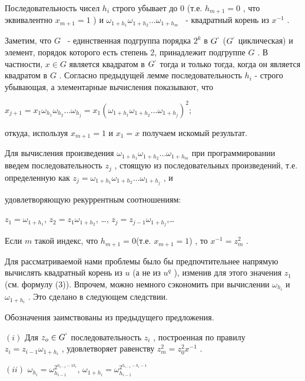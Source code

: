 Последовательность чисел $h_i$
 строго убывает до 0 (т.е. $h_{m+1}=0$
    , что эквивалентно $x_{m+1}=1$
) и $\omega_{1+h_1}\omega_{1+h_2}\ldots\omega_{1+h_m}$
 ~- квадратный корень из $x^{-1}$
 .


\begin{myproof}
Заметим, что $G$
 ~- единственная подгруппа порядка $2^k$
 в $G^`$
 ($G^`$
 циклическая) и элемент, порядок которого есть степень 2, принадлежит подгруппе $G$
 . В частности, $x\in G$
 является квадратом в $G^`$
 тогда и только тогда, когда он является квадратом в $G$
 .
Согласно предыдущей лемме последовательность $h_i$
 - строго убывающая, а элементарные вычисления показывают, что

\begin{center}
$x_{j+1}= x_1\omega_{h_1}\omega_{h_2}\ldots\omega_{h_j} = x_1(\omega_{1+h_1}\omega_{1+h_2}\ldots\omega_{1+h_j})^2$;
\end{center}


откуда, используя $x_{m+1}=1$
 и $x_1=x$
 получаем искомый результат.
\end{myproof}

Для вычисления произведения $\omega_{1+h_1}\omega_{1+h_2}\ldots\omega_{1+h_m}$
 при программировании введем последовательность $z_j$
 , стоящую из последовательных произведений, т.е. определенную как $z_j = \omega_{1+h_1}\omega_{1+h_2}\ldots\omega_{1+h_j}$
, и

\newpage

удовлетворяющую рекуррентным соотношениям:

\begin{center}
$z_1 = \omega_{1+h_1}$, $z_2=z_1\omega_{1+h_2}$, \ldots, $z_j=z_{j-1}\omega_{1+h_j}$,\ldots
\end{center}


Если $m$
 такой индекс, что $h_{m+1}=0$(т.е. $x_{m+1}=1$)
 , то $x^{-1}=z_m^2$
.

Для рассматриваемой нами проблемы было бы предпочтительнее напрямую вычислять квадратный корень из $u$
 (а не из $u^q$
    ), изменив для этого значения $z_1$
 (см. формулу (3)). Впрочем, можно немного сэкономить при вычислении $\omega_{h_i}$
 и $\omega_{1+h_i}$
 . Это сделано в следующем следствии.

\begin{sled}
Обозначения заимствованы из предыдущего предложения.

$(i)$ Для $z_o\in G^`$
 последовательность $z_i$
 , построенная по правилу $z_i=z_{i-1}\omega_{1+h_i}$
, удовлетворяет равенству $z_m^2=z_0^2x^{-1}$
.

$(ii)$ $\omega_{h_i}=\omega_{h_{i-1}}^{2^{h_{i-1}-1h_i}}$, $\omega_{1+h_i}=\omega_{h_{i-1}}^{2^{h_{i-1}-h_i-1}}$ 
\end{sled}

